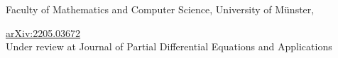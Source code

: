\small{Faculty of Mathematics and Computer Science, University of M{\"u}nster,}
\smallskip

\begin{center}
  \href{https://arxiv.org/abs/2205.03672}{arXiv:2205.03672}\\
  Under review at Journal of Partial Differential Equations and Applications
\end{center}

